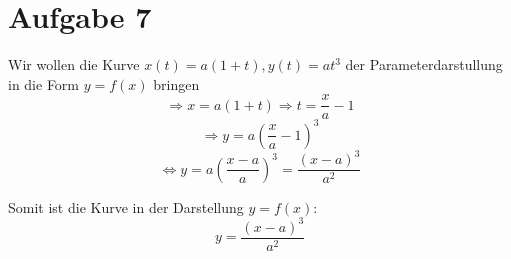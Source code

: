 \section{Aufgabe 7}
Wir wollen die Kurve $ x(t) = a(1 + t), y(t) = at^3$ der Parameterdarstullung in die Form $y = f(x)$ bringen
$$ \Rightarrow x = a(1 + t) \Rightarrow t = \frac{x}{a} - 1$$
$$\Rightarrow y = a\left(\frac{x}{a} - 1\right)^3 $$
$$ \Leftrightarrow y = a\left(\frac{x - a}{a}\right)^3 = \frac{(x - a)^3}{a^2}$$

Somit ist die Kurve in der Darstellung \( y = f(x) \):
$$
y = \frac{(x - a)^3}{a^2}
$$
